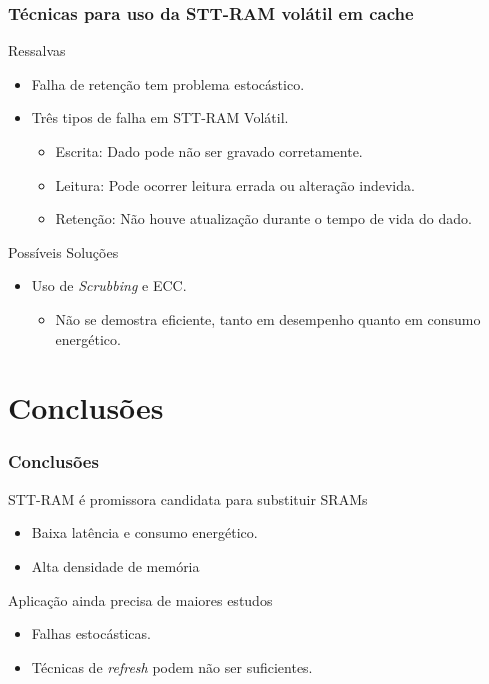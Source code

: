 \documentclass[10pt, pdf,xcolor=pdftex,dvipsnames,table]{beamer}
\begin{document}
\frame
{
\frametitle{Técnicas para uso da STT-RAM volátil em cache}
		\begin{block}{Ressalvas}
			\begin{itemize}
				\item Falha de retenção tem problema estocástico.
				\item Três tipos de falha em STT-RAM Volátil.
				\begin{itemize}
					\item Escrita: Dado pode não ser gravado corretamente.
					\item Leitura: Pode ocorrer leitura errada ou alteração indevida.
					\item Retenção: Não houve atualização durante o tempo de vida do dado.
				\end{itemize} 
			\end{itemize}	 
		\end{block}
		\begin{block}{Possíveis Soluções}
			\begin{itemize}
				\item Uso de \textit{Scrubbing} e ECC.
				\begin{itemize}
					\item Não se demostra eficiente, tanto em desempenho quanto em consumo energético.
				\end{itemize} 
			\end{itemize}	 
		\end{block}
}

\section{Conclusões}

\frame
{
\frametitle{Conclusões}
		\begin{block}{STT-RAM é promissora candidata para substituir SRAMs}
			\begin{itemize}
				\item Baixa latência e consumo energético.
				\item Alta densidade de memória
			\end{itemize}	 
		\end{block}
		\begin{block}{Aplicação ainda precisa de maiores estudos}
			\begin{itemize}
				\item Falhas estocásticas.				
				\item Técnicas de \textit{refresh} podem não ser suficientes.
			\end{itemize}
		\end{block}
}


\titlepage
\end{document}
